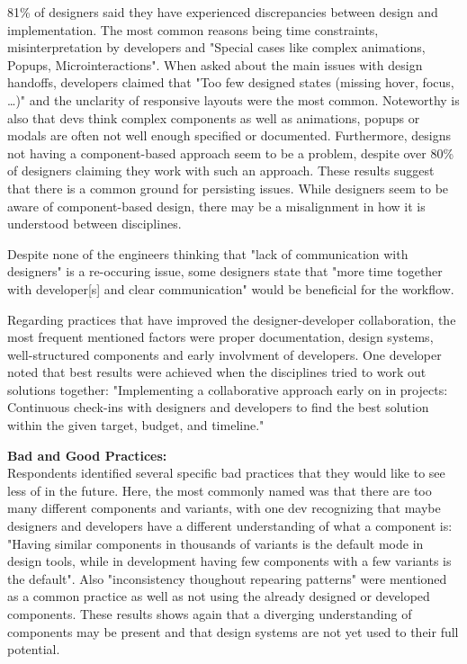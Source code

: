 81\% of designers said they have experienced discrepancies between design and implementation. The
most common reasons being time constraints, misinterpretation by developers and "Special cases like
complex animations, Popups, Microinteractions". When asked about the main issues with design
handoffs, developers claimed that "Too few designed states (missing hover, focus, \dots)" and
the unclarity of responsive layouts were the most common. Noteworthy is also that devs think complex
components as well as animations, popups or modals are often not well enough specified or
documented. Furthermore, designs not having a component-based approach seem to be a problem, despite
over 80\% of designers claiming they work with such an approach.
These results suggest that there is a common ground for persisting issues. While designers seem to
be aware of component-based design, there may be a misalignment in how it is understood between
disciplines.

Despite none of the engineers thinking that "lack of communication with designers" is a re-occuring
issue, some designers state that "more time together with developer[s] and clear communication"
would be beneficial for the workflow.

Regarding practices that have improved the designer-developer collaboration, the most frequent
mentioned factors were proper documentation, design systems, well-structured components and early
involvment of developers. One developer noted that best results were achieved when the disciplines
tried to work out solutions together:
"Implementing a collaborative approach early on in projects: Continuous check-ins with designers and
developers to find the best solution within the given target, budget, and timeline."

\textbf{Bad and Good Practices:}\\
Respondents identified several specific bad practices that they would like to see less of in the
future. Here, the most commonly named was that there are too many different components and variants,
with one dev recognizing that maybe designers and developers have a different understanding of what
a component is: "Having similar components in thousands of variants is the default mode in design
tools, while in development having few components with a few variants is the default". Also
"inconsistency thoughout repearing patterns" were mentioned as a common practice as well as not
using the already designed or developed components.
These results shows again that a diverging understanding of components may be present and that
design systems are not yet used to their full potential.

